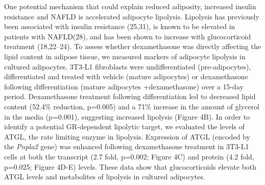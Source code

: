 \documentclass[11pt]{article} %
\begin{document}
One potential mechanism that could explain reduced adiposity, increased
insulin resistance and NAFLD is accelerated adipocyte lipolysis.
Lipolysis has previously been associated with insulin resistance
(25,31), is known to be elevated in patients with NAFLD(28), and has
been shown to increase with glucocorticoid treatment (18,22--24). To
assess whether dexamethasone was directly affecting the lipid content in
adipose tissue, we measured markers of adipocyte lipolysis in cultured
adipocytes. 3T3-L1 fibroblasts were undifferentiated (pre-adipocytes),
differentiated and treated with vehicle (mature adipocytes) or
dexamethasone following differentiation (mature adipocytes
+dexamethasone) over a 15-day period. Dexamethasone treatment following
differentiation led to decreased lipid content (52.4\% reduction,
p=0.005) and a 71\% increase in the amount of glycerol in the media
(p=0.001), suggesting increased lipolysis (Figure 4B). In order to
identify a potential GR-dependent lipolytic target, we evaluated the
levels of ATGL, the rate limiting enzyme in lipolysis. Expression of
ATGL (encoded by the \emph{Pnpla2} gene) was enhanced following
dexamethasone treatment in 3T3-L1 cells at both the transcript (2.7
fold, p=0.002; Figure 4C) and protein (4.2 fold, p=0.025; Figure 4D-E)
levels. These data show that glucocorticoids elevate both ATGL levels
and metabolites of lipolysis in cultured adipocytes.
\end{document}
